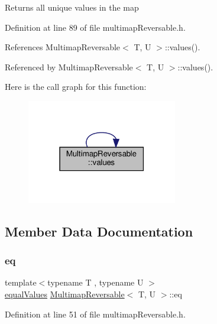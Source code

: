 \begin{DoxyReturn}{Returns}
all unique values in the map 
\end{DoxyReturn}


Definition at line 89 of file multimap\+Reversable.\+h.



References Multimap\+Reversable$<$ T, U $>$\+::values().



Referenced by Multimap\+Reversable$<$ T, U $>$\+::values().

Here is the call graph for this function\+:
\nopagebreak
\begin{figure}[H]
\begin{center}
\leavevmode
\includegraphics[width=186pt]{classMultimapReversable_a85a6dee36cb566aa874e9d18b5328757_cgraph}
\end{center}
\end{figure}


\subsection{Member Data Documentation}
\mbox{\label{classMultimapReversable_aca94996435f9aef6866914049a87c303}} 
\subsubsection{\texorpdfstring{eq}{eq}}
{\footnotesize\ttfamily template$<$typename T , typename U $>$ \\
\hyperlink{classMultimapReversable_a73c1b30be5bb8d65b1bcfa5e0958a581}{equal\+Values} \hyperlink{classMultimapReversable}{Multimap\+Reversable}$<$ T, U $>$\+::eq\hspace{0.3cm}{\ttfamily [private]}}



Definition at line 51 of file multimap\+Reversable.\+h.

